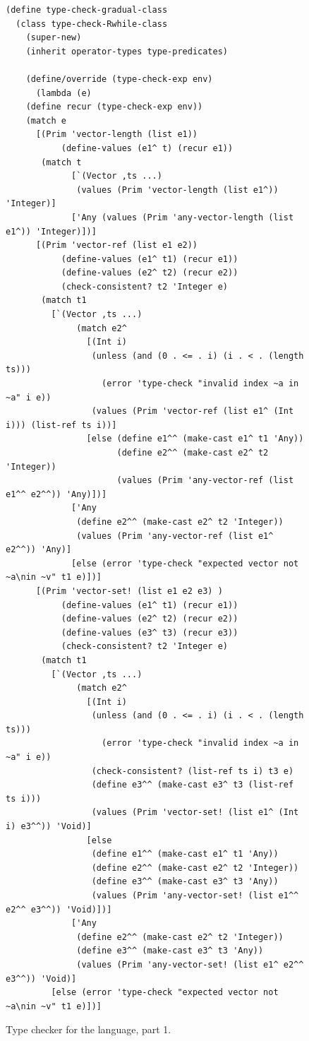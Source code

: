 \documentclass[11pt]{book}
\begin{document}
\begin{figure}[tbp]
\begin{lstlisting}[basicstyle=\ttfamily\scriptsize]
(define type-check-gradual-class
  (class type-check-Rwhile-class
    (super-new)
    (inherit operator-types type-predicates)

    (define/override (type-check-exp env)
      (lambda (e)
	(define recur (type-check-exp env))
	(match e
	  [(Prim 'vector-length (list e1))
           (define-values (e1^ t) (recur e1))
	   (match t
             [`(Vector ,ts ...)
              (values (Prim 'vector-length (list e1^)) 'Integer)]
             ['Any (values (Prim 'any-vector-length (list e1^)) 'Integer)])]
	  [(Prim 'vector-ref (list e1 e2))
           (define-values (e1^ t1) (recur e1))
           (define-values (e2^ t2) (recur e2))
           (check-consistent? t2 'Integer e)
	   (match t1
	     [`(Vector ,ts ...)
              (match e2^
                [(Int i)
                 (unless (and (0 . <= . i) (i . < . (length ts)))
                   (error 'type-check "invalid index ~a in ~a" i e))
                 (values (Prim 'vector-ref (list e1^ (Int i))) (list-ref ts i))]
                [else (define e1^^ (make-cast e1^ t1 'Any))
                      (define e2^^ (make-cast e2^ t2 'Integer))
                      (values (Prim 'any-vector-ref (list e1^^ e2^^)) 'Any)])]
             ['Any
              (define e2^^ (make-cast e2^ t2 'Integer))
              (values (Prim 'any-vector-ref (list e1^ e2^^)) 'Any)]
             [else (error 'type-check "expected vector not ~a\nin ~v" t1 e)])]
	  [(Prim 'vector-set! (list e1 e2 e3) )
           (define-values (e1^ t1) (recur e1))
           (define-values (e2^ t2) (recur e2))
           (define-values (e3^ t3) (recur e3))
           (check-consistent? t2 'Integer e)
	   (match t1
	     [`(Vector ,ts ...)
              (match e2^
                [(Int i)
                 (unless (and (0 . <= . i) (i . < . (length ts)))
                   (error 'type-check "invalid index ~a in ~a" i e))
                 (check-consistent? (list-ref ts i) t3 e)
                 (define e3^^ (make-cast e3^ t3 (list-ref ts i)))
                 (values (Prim 'vector-set! (list e1^ (Int i) e3^^)) 'Void)]
                [else
                 (define e1^^ (make-cast e1^ t1 'Any))
                 (define e2^^ (make-cast e2^ t2 'Integer))
                 (define e3^^ (make-cast e3^ t3 'Any))
                 (values (Prim 'any-vector-set! (list e1^^ e2^^ e3^^)) 'Void)])]
             ['Any
              (define e2^^ (make-cast e2^ t2 'Integer))
              (define e3^^ (make-cast e3^ t3 'Any))
              (values (Prim 'any-vector-set! (list e1^ e2^^ e3^^)) 'Void)]
	     [else (error 'type-check "expected vector not ~a\nin ~v" t1 e)])]
\end{lstlisting}
\caption{Type checker for the \LangGrad{} language, part 1.}
\label{fig:type-check-Rgradual-1}
\end{figure}
\end{document}

